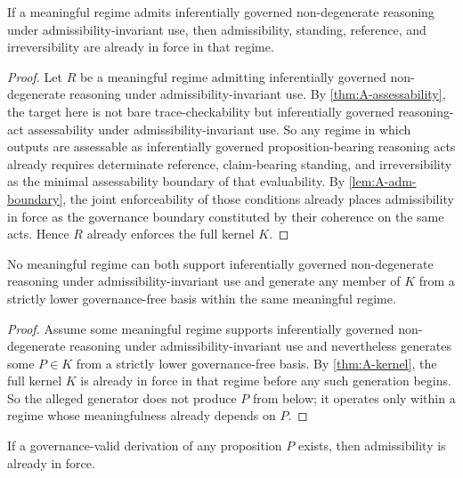 \begin{theorem}
\label{thm:A-kernel}
If a meaningful regime admits inferentially governed non-degenerate reasoning under admissibility-invariant use, then admissibility, standing, reference, and irreversibility are already in force in that regime.
\end{theorem}

\begin{proof}
Let $R$ be a meaningful regime admitting inferentially governed non-degenerate reasoning under admissibility-invariant use. By \cref{thm:A-assessability}, the target here is not bare trace-checkability but inferentially governed reasoning-act assessability under admissibility-invariant use. So any regime in which outputs are assessable as inferentially governed proposition-bearing reasoning acts already requires determinate reference, claim-bearing standing, and irreversibility as the minimal assessability boundary of that evaluability. By \cref{lem:A-adm-boundary}, the joint enforceability of those conditions already places admissibility in force as the governance boundary constituted by their coherence on the same acts. Hence $R$ already enforces the full kernel $K$.
\end{proof}

\begin{corollary}
\label{cor:A-no-below-kernel}
No meaningful regime can both support inferentially governed non-degenerate reasoning under admissibility-invariant use and generate any member of $K$ from a strictly lower governance-free basis within the same meaningful regime.
\end{corollary}

\begin{proof}
Assume some meaningful regime supports inferentially governed non-degenerate reasoning under admissibility-invariant use and nevertheless generates some $P\in K$ from a strictly lower governance-free basis. By \cref{thm:A-kernel}, the full kernel $K$ is already in force in that regime before any such generation begins. So the alleged generator does not produce $P$ from below; it operates only within a regime whose meaningfulness already depends on $P$.
\end{proof}

\begin{lemma}
\label{lem:A-der-adm}
If a governance-valid derivation of any proposition $P$ exists, then admissibility is already in force.
\end{lemma}

